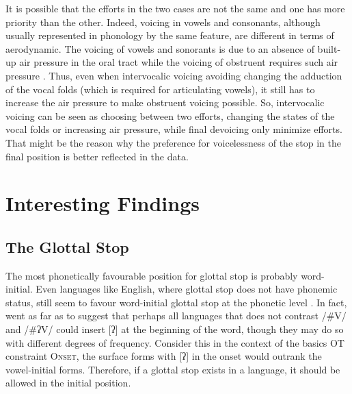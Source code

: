 \par
It is possible that the efforts in the two cases are not the same and one has more priority than the other.
Indeed, voicing in vowels and consonants, although usually represented in phonology by the same feature, are different in terms of aerodynamic.
The voicing of vowels and sonorants is due to an absence of built-up air pressure in the oral tract while the voicing of obstruent requires such air pressure \citep{harris2009final}.
Thus, even when intervocalic voicing avoiding changing the adduction of the vocal folds (which is required for articulating vowels), it still has to increase the air pressure to make obstruent voicing possible.
So, intervocalic voicing can be seen as choosing between two efforts, changing the states of the vocal folds or increasing air pressure, while final devoicing only minimize efforts. 
That might be the reason why the preference for voicelessness of the stop in the final position is better reflected in the data.

\section{Interesting Findings}  

\subsection{The Glottal Stop}
The most phonetically favourable position for glottal stop is probably word-initial. 
Even languages like English, where glottal stop does not have phonemic status, still seem to favour word-initial glottal stop at the phonetic level \citep{garellekGlottalStop}. 
In fact, \citet{garellekGlottalStop} went as far as to suggest that perhaps all languages that does not contrast /\#V/ and /\#ʔV/ could insert [ʔ] at the beginning of the word, though they may do so with different degrees of frequency. Consider this in the context of the basics OT constraint \textsc{Onset}, the surface forms with [ʔ] in the onset would outrank the vowel-initial forms. 
Therefore, if a glottal stop exists in a language, it should be allowed in the initial position.

